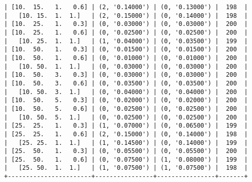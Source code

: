 \documentclass{article}
\begin{document}
\begin{verbatim}
| [10.  15.   1.   0.6] | (2, '0.14000') | (0, '0.13000') |  198  |
|   [10. 15.  1.  1.]   | (2, '0.15000') | (0, '0.14000') |  198  |
| [10.  25.   1.   0.3] | (0, '0.03000') | (0, '0.03000') |  200  |
| [10.  25.   1.   0.6] | (0, '0.02500') | (0, '0.02500') |  200  |
|   [10. 25.  1.  1.]   | (1, '0.04000') | (0, '0.03500') |  199  |
| [10.  50.   1.   0.3] | (0, '0.01500') | (0, '0.01500') |  200  |
| [10.  50.   1.   0.6] | (0, '0.01000') | (0, '0.01000') |  200  |
|   [10. 50.  1.  1.]   | (0, '0.03000') | (0, '0.03000') |  200  |
| [10.  50.   3.   0.3] | (0, '0.03000') | (0, '0.03000') |  200  |
| [10.  50.   3.   0.6] | (0, '0.03500') | (0, '0.03500') |  200  |
|   [10. 50.  3.  1.]   | (0, '0.04000') | (0, '0.04000') |  200  |
| [10.  50.   5.   0.3] | (0, '0.02000') | (0, '0.02000') |  200  |
| [10.  50.   5.   0.6] | (0, '0.02500') | (0, '0.02500') |  200  |
|   [10. 50.  5.  1.]   | (0, '0.02500') | (0, '0.02500') |  200  |
| [25.  25.   1.   0.3] | (1, '0.07000') | (0, '0.06500') |  199  |
| [25.  25.   1.   0.6] | (2, '0.15000') | (0, '0.14000') |  198  |
|   [25. 25.  1.  1.]   | (1, '0.14500') | (0, '0.14000') |  199  |
| [25.  50.   1.   0.3] | (0, '0.05500') | (0, '0.05500') |  200  |
| [25.  50.   1.   0.6] | (0, '0.07500') | (1, '0.08000') |  199  |
|   [25. 50.  1.  1.]   | (1, '0.07500') | (1, '0.07500') |  198  |
+-----------------------+----------------+----------------+-------+
\end{verbatim}
\end{document}
